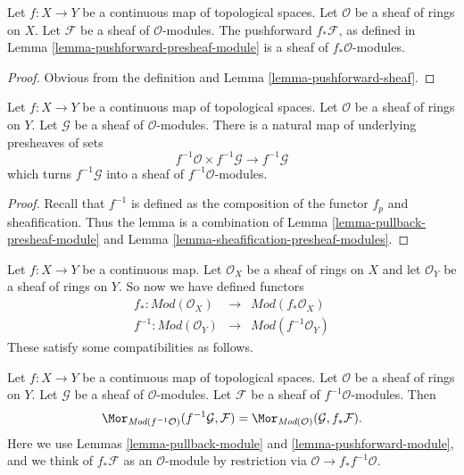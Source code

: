 \begin{lemma}
\label{lemma-pushforward-module}
Let $f : X \to Y$ be a continuous map of topological spaces.
Let $\mathcal{O}$ be a sheaf of rings on $X$. Let
$\mathcal{F}$ be a sheaf of $\mathcal{O}$-modules.
The pushforward $f_*\mathcal{F}$, as defined in
Lemma \ref{lemma-pushforward-presheaf-module}
is a sheaf of $f_*\mathcal{O}$-modules.
\end{lemma}

\begin{proof}
Obvious from the definition and Lemma \ref{lemma-pushforward-sheaf}.
\end{proof}

\begin{lemma}
\label{lemma-pullback-module}
Let $f : X \to Y$ be a continuous map of topological spaces.
Let $\mathcal{O}$ be a sheaf of rings on $Y$. Let
$\mathcal{G}$ be a sheaf of $\mathcal{O}$-modules.
There is a natural map of underlying presheaves of sets
$$
f^{-1}\mathcal{O} \times f^{-1}\mathcal{G}
\longrightarrow
f^{-1}\mathcal{G}
$$
which turns $f^{-1}\mathcal{G}$ into a
sheaf of $f^{-1}\mathcal{O}$-modules.
\end{lemma}

\begin{proof}
Recall that $f^{-1}$ is defined as the composition of the
functor $f_p$ and sheafification. Thus the lemma
is a combination of Lemma \ref{lemma-pullback-presheaf-module}
and Lemma \ref{lemma-sheafification-presheaf-modules}.
\end{proof}

\noindent
Let $f : X \to Y$ be a continuous map.
Let $\mathcal{O}_X$ be a sheaf of rings on $X$ and
let $\mathcal{O}_Y$ be a sheaf of rings on $Y$.
So now we have defined functors
\begin{eqnarray*}
f_* : \textit{Mod}(\mathcal{O}_X) &
\longrightarrow &
\textit{Mod}(f_*\mathcal{O}_X) \\
f^{-1} : \textit{Mod}(\mathcal{O}_Y) &
\longrightarrow &
\textit{Mod}(f^{-1}\mathcal{O}_Y)
\end{eqnarray*}
These satisfy some compatibilities as follows.

\begin{lemma}
\label{lemma-adjoint-push-pull-modules}
Let $f : X \to Y$ be a continuous map of topological spaces.
Let $\mathcal{O}$ be a sheaf of rings on $Y$.
Let $\mathcal{G}$ be a sheaf of $\mathcal{O}$-modules.
Let $\mathcal{F}$ be a sheaf of $f^{-1}\mathcal{O}$-modules.
Then
$$
\Mor_{\textit{Mod}(f^{-1}\mathcal{O})}(f^{-1}\mathcal{G}, \mathcal{F})
=
\Mor_{\textit{Mod}(\mathcal{O})}(\mathcal{G}, f_*\mathcal{F}).
$$
Here we use
Lemmas \ref{lemma-pullback-module}
and \ref{lemma-pushforward-module}, and we think of
$f_*\mathcal{F}$ as an $\mathcal{O}$-module by restriction via
$\mathcal{O} \to f_*f^{-1}\mathcal{O}$.
\end{lemma}

